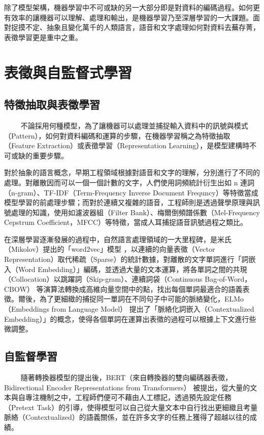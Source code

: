 除了模型架構，機器學習中不可或缺的另一大部分即是對資料的編碼過程。如何更有效率的讓機器可以理解、處理和輸出，是機器學習乃至深層學習的一大課題。面對捉摸不定、抽象且變化萬千的人類語言，語音和文字處理如何對資料去蕪存菁，表徵學習更是重中之重。

\section{表徵與自監督式學習}

\subsection{特徵抽取與表徵學習 }
　　
不論採用何種模型，為了讓機器可以處理並捕捉輸入資料中的訊號與模式（Pattern），如何對資料編碼和運算的步驟，在機器學習稱之為特徵抽取（Feature Extraction）或表徵學習（Representation Learning），是模型建構時不可或缺的重要步驟。

對於抽象的語言概念，早期工程領域根據對語音和文字的理解，分別進行了不同的處理。對離散因而可以一個一個計數的文字，人們使用詞頻統計衍生出如 n 連詞（n-gram）、TF-IDF（Term-Frequency Inverse Document Frequncy）等特徵當成模型學習的前處理步驟；而對於連續又複雜的語音，工程師則是透過聲學原理與訊號處理的知識，使用如濾波器組（Filter Bank）、梅爾倒頻譜係數（Mel-Frequency Cepstrum Coefficient，MFCC）等特徵，當成人耳捕捉語音訊號過程之類比。

在深層學習逐漸發展的過程中，自然語言處理領域的一大里程碑，是米氏（Mikolov）提出的「word2vec」模型 \cite{mikolov_efficient_2013}，以連續的向量表徵（Vector Representation）取代稀疏（Sparse）的統計數據，對離散的文字單詞進行「詞嵌入（Word Embedding）」編碼，並透過大量的文本運算，將各單詞之間的共現（Collocation）以跳躍詞（Skip-gram）、連續詞袋（Continuous Bag-of-Word，CBOW） 等演算法轉換成高維向量空間中的點，找出每個單詞最適合的語義表徵。爾後，為了更細緻的捕捉同一單詞在不同句子中可能的脈絡變化，ELMo（Embeddings from Language Model）\cite{peters_deep_2018} 提出了「脈絡化詞嵌入（Contextualized Embedding）」的概念，使得各個單詞在運算出表徵的過程可以根據上下文進行些微調整。

\subsection{自監督學習}
　　
隨著轉換器模型的提出後，BERT（來自轉換器的雙向編碼器表徵，Bidirectional Encoder Representations from Transformers）\cite{devlin_bert_2019} 被提出，從大量的文本與自專注機制之中，工程師們便可不藉由人工標記，透過預先設定任務（Pretext Task）的引導，使得模型可以自己從大量文本中自行找出更細緻且考量脈絡（Contextualized）的語義關係，並在許多文字的任務上獲得了超越以往的成績。

